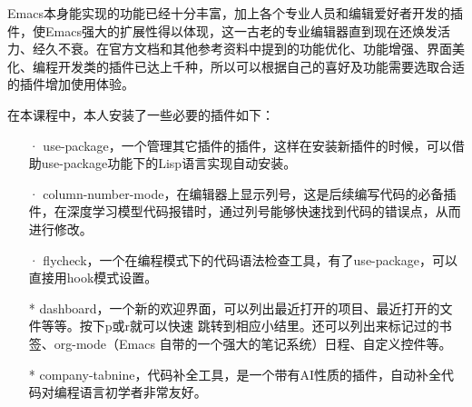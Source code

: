 \documentclass[a4paper]{article}
\begin{document}
  Emacs本身能实现的功能已经十分丰富，加上各个专业人员和编辑爱好者开发的插件，使Emacs强大的扩展性得以体现，这一古老的专业编辑器直到现在还焕发活力、经久不衰。在官方文档和其他参考资料中提到的功能优化、功能增强、界面美化、编程开发类的插件已达上千种，所以可以根据自己的喜好及功能需要选取合适的插件增加使用体验。\par
  在本课程中，本人安装了一些必要的插件如下：\par
  \begin{enumerate}
                \item[·] use-package，一个管理其它插件的插件，这样在安装新插件的时候，可以借助use-package功能下的Lisp语言实现自动安装。
                \item[·] column-number-mode，在编辑器上显示列号，这是后续编写代码的必备插件，在深度学习模型代码报错时，通过列号能够快速找到代码的错误点，从而进行修改。
                \item[·] flycheck，一个在编程模式下的代码语法检查工具，有了use-package，可以直接用hook模式设置。
                \item[*] dashboard，一个新的欢迎界面，可以列出最近打开的项目、最近打开的文件等等。按下p或r就可以快速 跳转到相应小结里。还可以列出来标记过的书签、org-mode（Emacs 自带的一个强大的笔记系统）日程、自定义控件等。
                \item[*] company-tabnine，代码补全工具，是一个带有AI性质的插件，自动补全代码对编程语言初学者非常友好。
                \end{enumerate}
\end{document}
